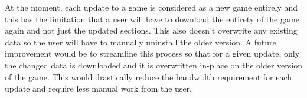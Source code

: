 At the moment, each update to a game is considered as a new game entirely and this has the limitation that a user will have to download the entirety of the game again and not just the updated sections. This also doesn't overwrite any existing data so the user will have to manually uninstall the older version.
\x
A future improvement would be to streamline this process so that for a given update, only the changed data is downloaded and it is overwritten in-place on the older version of the game. This would drastically reduce the bandwidth requirement for each update and require less manual work from the user.


